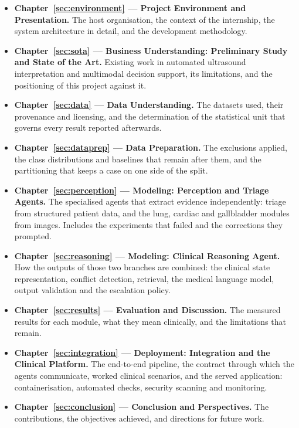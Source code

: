\begin{itemize}[label=$\bullet$]
  \setlength\itemsep{-0.1em}
  \item \textbf{Chapter~\ref{sec:environment} --- Project Environment and Presentation.}
    The host organisation, the context of the internship, the system architecture in
    detail, and the development methodology.
  \item \textbf{Chapter~\ref{sec:sota} --- Business Understanding: Preliminary Study and
    State of the Art.} Existing work in automated ultrasound interpretation and multimodal
    decision support, its limitations, and the positioning of this project against it.
  \item \textbf{Chapter~\ref{sec:data} --- Data Understanding.} The datasets used, their
    provenance and licensing, and the determination of the statistical unit that governs
    every result reported afterwards.
  \item \textbf{Chapter~\ref{sec:dataprep} --- Data Preparation.} The exclusions applied, the
    class distributions and baselines that remain after them, and the partitioning that keeps
    a case on one side of the split.
  \item \textbf{Chapter~\ref{sec:perception} --- Modeling: Perception and Triage Agents.}
    The specialised agents that extract evidence independently: triage from structured
    patient data, and the lung, cardiac and gallbladder modules from images. Includes the
    experiments that failed and the corrections they prompted.
  \item \textbf{Chapter~\ref{sec:reasoning} --- Modeling: Clinical Reasoning Agent.} How the
    outputs of those two branches are combined: the clinical state representation, conflict
    detection, retrieval, the medical language model, output validation and the escalation
    policy.
  \item \textbf{Chapter~\ref{sec:results} --- Evaluation and Discussion.} The measured
    results for each module, what they mean clinically, and the limitations that remain.
  \item \textbf{Chapter~\ref{sec:integration} --- Deployment: Integration and the Clinical
    Platform.} The end-to-end pipeline, the contract through which the agents communicate,
    worked clinical scenarios, and the served application: containerisation, automated
    checks, security scanning and monitoring.
  \item \textbf{Chapter~\ref{sec:conclusion} --- Conclusion and Perspectives.} The
    contributions, the objectives achieved, and directions for future work.
\end{itemize}
